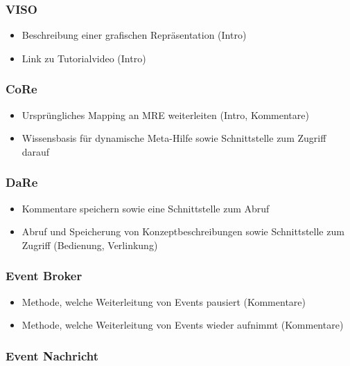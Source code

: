 \documentclass[
	headsepline,
	footsepline,
	fontsize=12pt,
	bibliography=totoc
]{scrbook}
\begin{document}
\subsubsection{VISO}

\begin{itemize}
	\item Beschreibung einer grafischen Repräsentation (Intro)
	\item Link zu Tutorialvideo (Intro)
\end{itemize}

\subsubsection{CoRe}

\begin{itemize}
	\item Ursprüngliches Mapping an MRE weiterleiten (Intro, Kommentare)
	\item Wissensbasis für dynamische Meta-Hilfe sowie Schnittstelle zum Zugriff darauf
\end{itemize}

\subsubsection{DaRe}

\begin{itemize}
	\item Kommentare speichern sowie eine Schnittstelle zum Abruf
	\item Abruf und Speicherung von Konzeptbeschreibungen sowie Schnittstelle zum Zugriff (Bedienung, Verlinkung)
\end{itemize}

\subsubsection{Event Broker}

\begin{itemize}
	\item Methode, welche Weiterleitung von Events pausiert (Kommentare)
	\item Methode, welche Weiterleitung von Events wieder aufnimmt (Kommentare)
\end{itemize}

\subsubsection{Event Nachricht}
\end{document}
